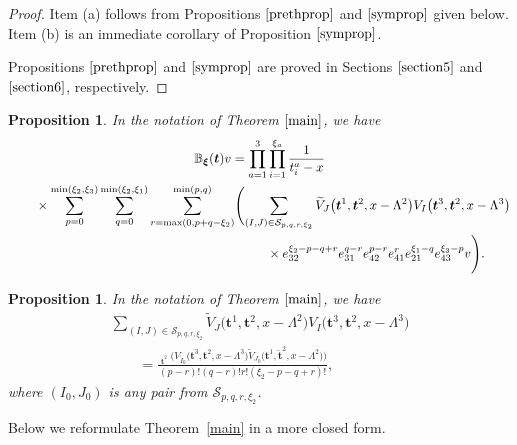 \documentclass[10pt,a4paper]{amsart}
\numberwithin{equation}{section}
\newtheorem{Proposition}[Theorem]{Proposition}
 { \theoremstyle{definition}
\newtheorem{Definition}[Theorem]{Definition}
\newtheorem*{Example}{Example}
\newtheorem*{Remark}{Remark} }
\DeclareMathOperator{\Symb}{\overline{Sym} }
\begin{document}
\begin{proof}
Item (a) follows from Propositions $\ref{prethprop}$ and $\ref{symprop}$ given below. Item (b) is an immediate corollary of Proposition $\ref{symprop}$.

Propositions $\ref{prethprop}$ and $\ref{symprop}$ are proved in Sections $\ref{section5}$ and $\ref{section6}$, respectively.
\end{proof}

\begin{Proposition}\label{prethprop}
In the notation of Theorem $\ref{main}$, we have
\begin{gather}
{\mathbb{B}}_{\boldsymbol{\xi}}(\boldsymbol{t}) v=\prod_{a=1}^{3}\prod_{i=1}^{\xi_a}\frac{1}{t^a_i-x}\nonumber\\
\qquad{}\times\sum\limits_{p=0}^{\min(\xi_2,\xi_3)} \sum\limits_{q=0}^{\min(\xi_2,\xi_1)}\sum\limits_{r=\max (0, p+q-\xi_2)}^{\min(p,q)} \Biggl(\sum\limits_{(I,J)\in \mathcal{S}_{p,q,r,\xi_2}} \widetilde{V}_{J}\bigl(\boldsymbol{t}^{ 1}, \boldsymbol{t}^{ 2},x-\Lambda^2\bigr)
V_{I}\bigl(\boldsymbol{t}^{ 3}, \boldsymbol{t}^{ 2},x-\Lambda^3\bigr)\nonumber\\
\qquad{}\hphantom{\times\sum\limits_{p=0}^{\min(\xi_2,\xi_3)} \sum\limits_{q=0}^{\min(\xi_2,\xi_1)}\sum\limits_{r=\max (0, p+q-\xi_2)}^{\min(p,q)} \Biggl(}{}
\times e_{32}^{\xi_2-p-q+r} e_{31}^{q-r} e_{42}^{p-r} e_{41}^{r} e_{21}^{\xi_1-q} e_{43}^{\xi_3-p} v\Biggr).\label{preth}
\end{gather}
\end{Proposition}

\begin{Proposition}\label{symprop}
In the notation of Theorem $\ref{main}$, we have
\begin{gather}
\sum\limits_{(I,J)\in \mathcal{S}_{p,q,r,\xi_2}} \widetilde{V}_{J}\bigl(\boldsymbol{t}^{ 1}, \boldsymbol{t}^{ 2},x-\Lambda^2\bigr) V_{I}\bigl(\boldsymbol{t}^{ 3}, \boldsymbol{t}^{ 2},x-\Lambda^3\bigr)
\nonumber\\
\qquad{} =\frac{ \Symb_{\boldsymbol{t}^2 } \bigl(V_{\check{I}_0}\bigl(\boldsymbol{t}^3, \boldsymbol{t}^2,x-\Lambda^3\bigr) \widetilde{V}_{J_0}\bigl( \boldsymbol{t}^1, \check{\boldsymbol{t}}^2,x-\Lambda^2\bigr)\bigr) }{(p-r)!(q-r)! r!(\xi_2-p-q+r)!},\label{sympropf}
\end{gather}
where $(I_0,J_0)$ is any pair from $\mathcal S_{p,q,r,\xi_2}$.
\end{Proposition}

Below we reformulate Theorem~\ref{main} in a more closed form.
\end{document}
